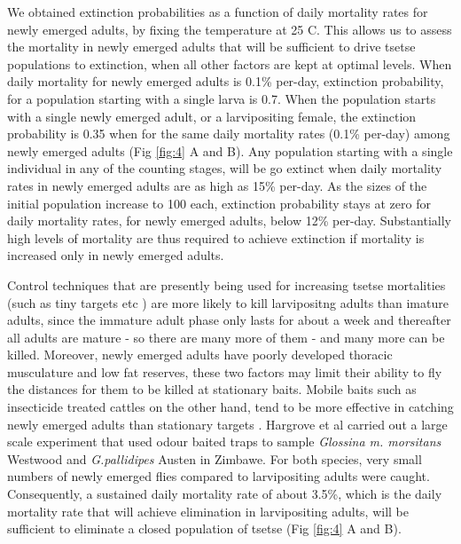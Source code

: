 \documentclass[smallextended]{svjour3}
\begin{document}
We obtained extinction probabilities as a function of daily mortality rates for newly emerged adults, by
fixing the temperature at 25 \degree C. This allows us to assess the mortality in newly emerged adults that will be sufficient to drive tsetse populations to extinction, when all other factors are kept at optimal levels. When daily mortality for newly emerged adults is 0.1\% per-day, extinction probability, for a population starting with a single larva is 0.7. When the population starts with a single newly emerged adult, or a larvipositing female, the extinction probability is 0.35 when for the same daily mortality rates (0.1\% per-day) among  newly emerged adults (Fig \ref{fig:4} A and B). Any population starting with a single individual in any of the counting stages, will be go extinct when daily mortality rates in newly emerged adults are as high as 15\% per-day. As the sizes of the initial population increase to 100 each, extinction probability stays at zero for daily mortality rates, for newly emerged adults, below 12\% per-day. Substantially high levels of mortality are thus required to achieve extinction if mortality is increased only in newly emerged adults.

Control techniques that are presently being used for increasing tsetse mortalities (such as tiny targets etc \cite{Hargrove2000,Esterhuizen2006,Shaw2015,Mbewe2018a}) are more likely to kill larvipositng adults than imature adults, since the immature adult phase only lasts for  about a week and thereafter all adults are mature - so there are many more of them - and many more can be killed. Moreover, newly emerged adults have poorly developed thoracic musculature and low fat reserves, these two factors may limit their ability to fly the distances for them to be killed at stationary baits. Mobile baits such as insecticide treated cattles on the other hand, tend to be more effective in catching newly emerged adults than stationary targets \cite{Hargrove1991}. Hargrove et al \cite{HargroveJ.W.HollowayM.T.P.ValeG.A.GoughA.J.E.Hall1995} carried out a large scale experiment that used  odour baited traps to sample  {\it Glossina m. morsitans} Westwood and {\it G.pallidipes} Austen in Zimbawe. For both species, very small numbers of newly emerged flies compared to larvipositing adults were caught. Consequently, a sustained daily mortality rate of about 3.5\%, which is the daily mortality rate that will achieve elimination in larvipositing adults, will be sufficient to eliminate a closed population of tsetse (Fig \ref{fig:4} A and B).  
\end{document}
